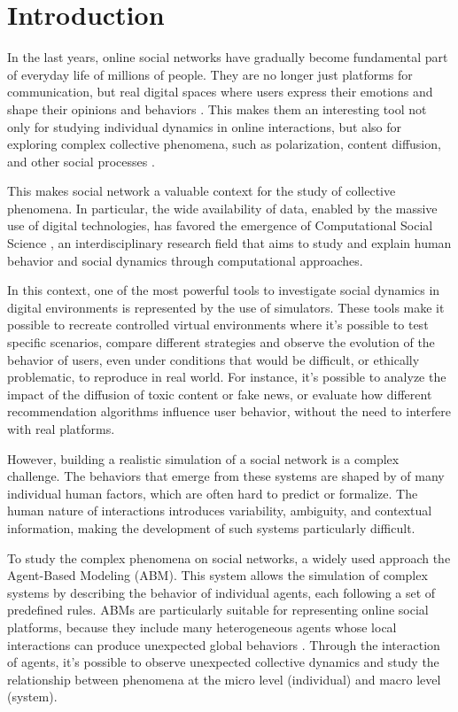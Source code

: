 \section{Introduction}
\label{sec:introduction}

In the last years, online social networks have gradually become fundamental part of everyday life of millions of people.
They are no longer just platforms for communication, but real digital spaces where users express their emotions and shape their opinions and behaviors \cite{bakshy2015}.
This makes them an interesting tool not only for studying individual dynamics in online interactions, but also for exploring complex collective phenomena, such as polarization, content diffusion, and other social processes \cite{vosoughi2018spread}.

This makes social network a valuable context for the study of collective phenomena.
In particular, the wide availability of data, enabled by the massive use of digital technologies, has favored the emergence of Computational Social Science \cite{lazer2009computational}, an interdisciplinary research field that aims to study and explain human behavior and social dynamics through computational approaches.

\medskip
In this context, one of the most powerful tools to investigate social dynamics in digital environments is represented by the use of simulators.
These tools make it possible to recreate controlled virtual environments where it's possible to test specific scenarios, compare different strategies and observe the evolution of the behavior of users, even under conditions that would be difficult, or ethically problematic, to reproduce in real world.
For instance, it's possible to analyze the impact of the diffusion of toxic content or fake news, or evaluate how different recommendation algorithms influence user behavior, without the need to interfere with real platforms.

However, building a realistic simulation of a social network is a complex challenge.
The behaviors that emerge from these systems are shaped by of many individual human factors, which are often hard to predict or formalize.
The human nature of interactions introduces variability, ambiguity, and contextual information, making the development of such systems particularly difficult.


\medskip
To study the complex phenomena on social networks, a widely used approach the Agent-Based Modeling (ABM).
This system allows the simulation of complex systems by describing the behavior of individual agents, each following a set of predefined rules.
ABMs are particularly suitable for representing online social platforms, because they include many heterogeneous agents whose local interactions can produce unexpected global behaviors \cite{gausen2021can}.
Through the interaction of agents, it's possible to observe unexpected collective dynamics and study the relationship between phenomena at the micro level (individual) and macro level (system).

